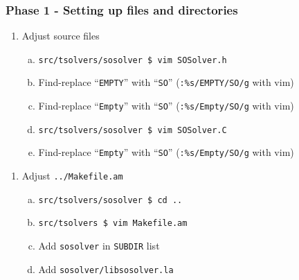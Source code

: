 \begin{frame}[fragile]
  \frametitle{Phase 1 - Setting up files and directories}

  \begin{enumerate}[4.]

    \item Adjust source files

    \begin{enumerate}[a.]

      \item \verb|src/tsolvers/sosolver $ vim SOSolver.h|

      \item Find-replace ``\verb|EMPTY|'' with ``\verb|SO|''
            (\verb|:%s/EMPTY/SO/g| with vim)

      \item Find-replace ``\verb|Empty|'' with ``\verb|SO|''
            (\verb|:%s/Empty/SO/g| with vim)

      \item \verb|src/tsolvers/sosolver $ vim SOSolver.C|

      \item Find-replace ``\verb|Empty|'' with ``\verb|SO|''
            (\verb|:%s/Empty/SO/g| with vim)

    \end{enumerate}

  \end{enumerate}

  \vfill\pause

  \begin{enumerate}[5.]

    \item Adjust \verb|../Makefile.am|

    \begin{enumerate}[a.]

      \item \verb|src/tsolvers/sosolver $ cd ..|

      \item \verb|src/tsolvers $ vim Makefile.am|

      \item Add \verb|sosolver| in \verb|SUBDIR| list

      \item Add \verb|sosolver/libsosolver.la|

    \end{enumerate}

  \end{enumerate}


\end{frame}
